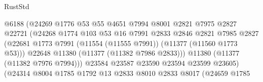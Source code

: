 \begin{lexlean}{RustStd}
\begin{coremodule}
                                          @6188
                                          (@24269
                                            @1776
                                            @53
                                            @55
                                            @4651
                                            @7994
                                            @8001
                                            @2821
                                            @7975
                                            @2827
                                            @22721
                                            (@24268
                                              @1774
                                              @103
                                              @53
                                              @16
                                              @7991
                                              @2833
                                              @2846
                                              @2821
                                              @7985
                                              @2827
                                              (@22681
                                                @1773
                                                @7991
                                                (@11554 (@11555 @7991))
                                                (@11377 (@11560 @1773 @53)))
                                              @22648
                                              @11380
                                              (@11377 (@11382 @7986 @2833)))
                                            @11380
                                            (@11377 (@11382 @7976 @7994)))
                                          @23584
                                          @23587
                                          @23590
                                          @23594
                                          @23599
                                          @23605)
                                        (@24314
                                          @8004
                                          @1785
                                          @1792
                                          @13
                                          @2833
                                          @8010
                                          @2833
                                          @8017
                                          (@24659
                                            @1785

\end{coremodule}
\end{lexlean}
